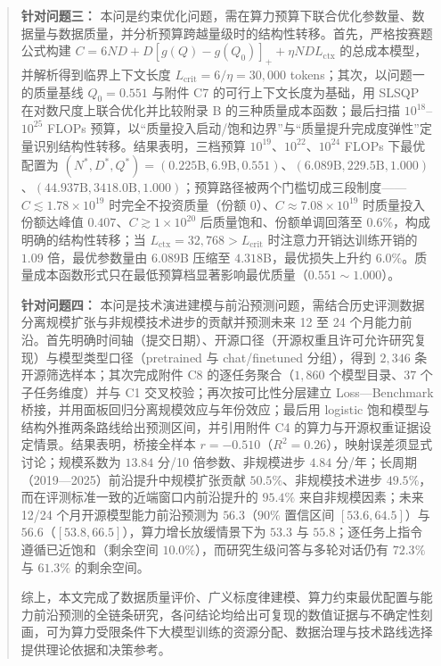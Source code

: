 \begin{abstract}
\textbf{针对问题三：} 本问是约束优化问题，需在算力预算下联合优化参数量、数据量与数据质量，并分析预算跨越量级时的结构性转移。首先，严格按赛题公式构建 $C=6ND+D[g(Q)-g(Q_0)]_{+}+\eta N D L_{\text{ctx}}$ 的总成本模型，并解析得到临界上下文长度 $L_{\text{crit}}=6/\eta=30{,}000$ tokens；其次，以问题一的质量基线 $Q_0=0.551$ 与附件 C7 的可行上下文长度为基础，用 SLSQP 在对数尺度上联合优化并比较附录 B 的三种质量成本函数；最后扫描 $10^{18}$–$10^{25}$ FLOPs 预算，以“质量投入启动/饱和边界”与“质量提升完成度弹性”定量识别结构性转移。结果表明，三档预算 $10^{19}$、$10^{22}$、$10^{24}$ FLOPs 下最优配置为 $(N^*,D^*,Q^*)=(0.225\text{B},6.9\text{B},0.551)$、$(6.089\text{B},229.5\text{B},1.000)$、$(44.937\text{B},3418.0\text{B},1.000)$；预算路径被两个门槛切成三段制度——$C\lesssim1.78\times10^{19}$ 时完全不投资质量（份额 $0$）、$C\approx7.08\times10^{19}$ 时质量投入份额达峰值 $0.407$、$C\gtrsim1\times10^{20}$ 后质量饱和、份额单调回落至 $0.6\%$，构成明确的结构性转移；当 $L_{\text{ctx}}=32{,}768>L_{\text{crit}}$ 时注意力开销达训练开销的 $1.09$ 倍，最优参数量由 $6.089$B 压缩至 $4.318$B，最优损失上升约 $6.0\%$。质量成本函数形式只在最低预算档显著影响最优质量（$0.551\sim1.000$）。

\textbf{针对问题四：} 本问是技术演进建模与前沿预测问题，需结合历史评测数据分离规模扩张与非规模技术进步的贡献并预测未来 12 至 24 个月能力前沿。首先明确时间轴（提交日期）、开源口径（开源权重且许可允许研究复现）与模型类型口径（pretrained 与 chat/finetuned 分组），得到 $2{,}346$ 条开源筛选样本；其次完成附件 C8 的逐任务聚合（$1{,}860$ 个模型目录、$37$ 个子任务维度）并与 C1 交叉校验；再次按可比性分层建立 Loss—Benchmark 桥接，并用面板回归分离规模效应与年份效应；最后用 logistic 饱和模型与结构外推两条路线给出预测区间，并引用附件 C4 的算力与开源权重证据设定情景。结果表明，桥接全样本 $r=-0.510$（$R^2=0.26$），映射误差须显式讨论；规模系数为 $13.84$ 分/10 倍参数、非规模进步 $4.84$ 分/年；长周期（2019—2025）前沿提升中规模扩张贡献 $50.5\%$、非规模技术进步 $49.5\%$，而在评测标准一致的近端窗口内前沿提升的 $95.4\%$ 来自非规模因素；未来 12/24 个月开源模型能力前沿预测为 $56.3$（$90\%$ 置信区间 $[53.6,64.5]$）与 $56.6$（$[53.8,66.5]$），算力增长放缓情景下为 $53.3$ 与 $55.8$；逐任务上指令遵循已近饱和（剩余空间 $10.0\%$），而研究生级问答与多轮对话仍有 $72.3\%$ 与 $61.3\%$ 的剩余空间。

综上，本文完成了数据质量评价、广义标度律建模、算力约束最优配置与能力前沿预测的全链条研究，各问结论均给出可复现的数值证据与不确定性刻画，可为算力受限条件下大模型训练的资源分配、数据治理与技术路线选择提供理论依据和决策参考。


\end{abstract}
\endgroup

